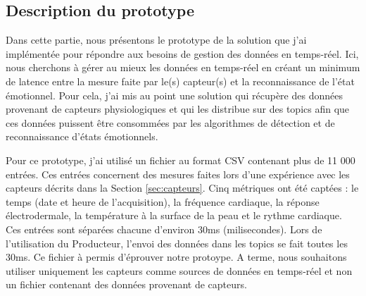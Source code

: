 \documentclass[11pt]{article}
\begin{document}
	\subsection{Description du prototype}\label{sec:protodesc}
		Dans cette partie, nous présentons le prototype de la solution que j'ai implémentée pour répondre aux besoins de gestion des données en temps-réel.
		Ici, nous cherchons à gérer au mieux les données en temps-réel en créant un minimum de latence entre la mesure faite par le(s) capteur(s) et la reconnaissance de l'état émotionnel.
		Pour cela, j'ai mis au point une solution qui récupère des données provenant de capteurs physiologiques et qui les distribue sur des topics afin que ces données puissent être consommées par les algorithmes de détection et de reconnaissance d'états émotionnels.\par
		Pour ce prototype, j'ai utilisé un fichier au format CSV contenant plus de 11 000 entrées. 
		Ces entrées concernent des mesures faites lors d'une expérience avec les capteurs décrits dans la Section \ref{sec:capteurs}.
		Cinq métriques ont été captées : le temps (date et heure de l'acquisition), la fréquence cardiaque, la réponse électrodermale, la température à la surface de la peau et le rythme cardiaque.
		Ces entrées sont séparées chacune d'environ 30ms (milisecondes).
		Lors de l'utilisation du Producteur, l'envoi des données dans les topics se fait toutes les 30ms.
		Ce fichier à permis d'éprouver notre protoype.
		A terme, nous souhaitons utiliser uniquement les capteurs comme sources de données en temps-réel et non un fichier contenant des données provenant de capteurs.
\end{document}
